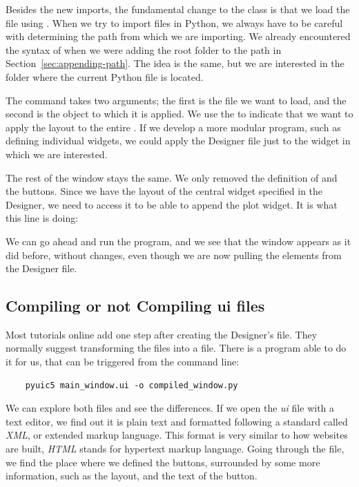 Besides the new imports, the fundamental change to the  class is that we load the file using . When we try to import files in Python, we always have to be careful with determining the path from which we are importing. We already encountered the syntax of  when we were adding the root folder to the path in Section~\ref{sec:appending-path}. The idea is the same, but we are interested in the folder where the current Python file is located.

The command  takes two arguments; the first is the file we want to load, and the second is the object to which it is applied. We use the  to indicate that we want to apply the layout to the entire . If we develop a more modular program, such as defining individual widgets, we could apply the Designer file just to the widget in which we are interested.

The rest of the window stays the same. We only removed the definition of  and the buttons. Since we have the layout of the central widget specified in the Designer, we need to access it to be able to append the plot widget. It is what this line is doing:


We can go ahead and run the program, and we see that the window appears as it did before, without changes, even though we are now pulling the elements from the Designer file.

\subsection{Compiling or not Compiling ui files}\label{subsec:compiling-or-not-compiling-ui-files}
Most tutorials online add one step after creating the Designer's file. They normally suggest transforming the  files into a  file. There is a program able to do it for us, that can be triggered from the command line:

\begin{verbatim}
    pyuic5 main_window.ui -o compiled_window.py
\end{verbatim}

We can explore both files and see the differences. If we open the \emph{ui} file with a text editor, we find out it is plain text and formatted following a standard called \emph{XML}, or extended markup language. This format is very similar to how websites are built, \emph{HTML} stands for hypertext markup language. Going through the file, we find the place where we defined the buttons, surrounded by some more information, such as the layout, and the text of the button.

